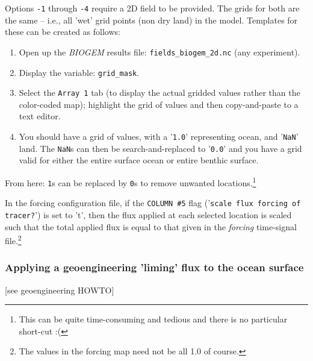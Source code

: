 \documentclass[11pt,fleqn]{book} %
\begin{document}
Options \texttt{-1} through \texttt{-4} require a 2D field to be provided. The grids for both are the same -- i.e., all 'wet' grid points (non dry land) in the model. Templates for these can be created as follows:

\begin{enumerate}[noitemsep]
\vspace{1mm}
\item Open up the \textit{BIOGEM} results file: \texttt{fields\_biogem\_2d.nc} (any experiment).
\vspace{1mm}
\item Display the variable: \texttt{grid\_mask}.
\vspace{1mm}
\item Select the \texttt{Array 1} tab (to display the actual gridded values rather than the color-coded map); highlight the grid of values and then copy-and-paste to a text editor.
\vspace{1mm}
\item You should have a grid of values, with a '\texttt{1.0}' representing ocean, and '\texttt{NaN}' land. The \texttt{NaN}s can then be search-and-replaced to '\texttt{0.0}' and you have a grid valid for either the entire surface ocean or entire benthic surface.
\end{enumerate}

From here: \texttt{1}s can be replaced by \texttt{0}s to remove unwanted locations.\footnote{This can be quite time-consuming and tedious and there is no particular short-cut :(}

In the forcing configuration file, if the \texttt{COLUMN \#5} flag ('\texttt{scale flux forcing of tracer?}') is set to 't', then the flux applied at each selected location is scaled such that the total applied flux is equal to that given in the \textit{forcing} time-signal file.\footnote{The values in the forcing map need not be all 1.0 of course.}

%
\subsubsection{Applying a geoengineering 'liming' flux to the ocean surface}

\vspace{1mm}
[see geoengineering HOWTO]


\newpage

\end{document}
